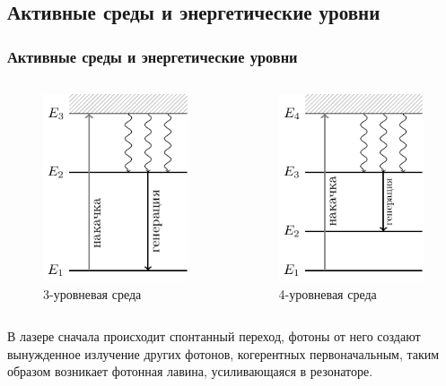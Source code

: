\documentclass[10pt,pdf,hyperref={unicode}, dvipsnames]{beamer}
\newcommand\frametitless[1]{\subsection{#1}\frametitle{#1}}
\begin{document}
\begin{frame}[t]
	\frametitless{Активные среды и энергетические уровни}

	\begin{columns}
		\begin{column}{0.49\textwidth}
			\begin{figure}[h]
				\centering
				\includegraphics[]{images/3nd}
				\caption{3-уровневая среда}
			\end{figure}	
		\end{column}
		\begin{column}{0.49\textwidth}
			\begin{figure}[h]
				\centering
				\includegraphics[]{images/4nd}
				\caption{4-уровневая среда}
			\end{figure}	
		\end{column}
	\end{columns}

	В лазере сначала происходит спонтанный переход, фотоны от него создают вынужденное излучение других фотонов, когерентных первоначальным, таким образом возникает фотонная лавина, усиливающаяся в резонаторе.

\end{frame}
\end{document}
